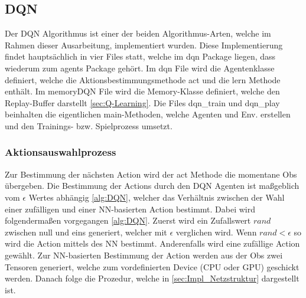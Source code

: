 \subsection{DQN} \label{sec:Impl:DQN}
Der DQN Algorithmus ist einer der beiden Algorithmus-Arten, welche im Rahmen dieser Ausarbeitung, implementiert wurden. Diese Implementierung findet hauptsächlich in vier Files statt, welche im dqn Package liegen, dass wiederum zum agents Package gehört.
Im dqn File wird die Agentenklasse definiert, welche die Aktionsbestimmungsmethode act und die lern Methode enthält. 
Im memoryDQN File wird die Memory-Klasse definiert, welche den Replay-Buffer darstellt \ref{sec:Q-Learning}. 
Die Files dqn\_train und dqn\_play beinhalten die eigentlichen main-Methoden, welche Agenten und Env. erstellen und den Trainings- bzw. Spielprozess umsetzt.

\subsubsection{Aktionsauswahlprozess}
Zur Bestimmung der nächsten Action wird der act Methode die momentane Obs übergeben.
Die Bestimmung der Actions durch den DQN Agenten ist maßgeblich vom $\epsilon$ Wertes abhängig \ref{alg:DQN}, welcher das Verhältnis zwischen der Wahl einer zufälligen und einer NN-basierten Action bestimmt. Dabei wird folgendermaßen vorgegangen \ref{alg:DQN}.
Zuerst wird ein Zufallswert $rand$ zwischen null und eins generiert, welcher mit $\epsilon$ verglichen wird. Wenn $rand < \epsilon$ so wird die Action mittels des NN bestimmt. Anderenfalls wird eine zufällige Action gewählt.
Zur NN-basierten Bestimmung der Action werden aus der Obs zwei Tensoren generiert, welche zum vordefinierten Device (CPU oder GPU) geschickt werden. Danach folge die Prozedur, welche in \ref{sec:Impl_Netzstruktur} dargestellt ist.

